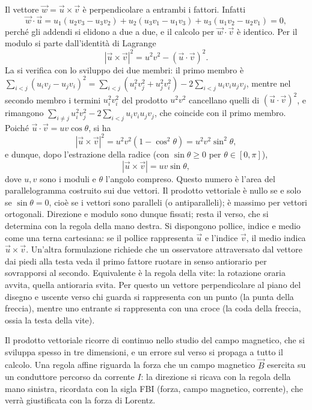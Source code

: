\documentclass[main.tex]{subfiles}
\begin{document}
Il vettore $\vec w=\vec u\times\vec v$ è perpendicolare a entrambi i fattori. Infatti
\[
\vec w\cdot\vec u=u_1(u_2v_3-u_3v_2)+u_2(u_3v_1-u_1v_3)+u_3(u_1v_2-u_2v_1)=0 ,
\]
perché gli addendi si elidono a due a due, e il calcolo per $\vec w\cdot\vec v$ è identico. Per il modulo si parte dall'identità di Lagrange
\[
|\vec u\times\vec v|^2=u^2v^2-(\vec u\cdot\vec v)^2 .
\]
La si verifica con lo sviluppo dei due membri: il primo membro è $\sum_{i<j}(u_iv_j-u_jv_i)^2=\sum_{i<j}(u_i^2v_j^2+u_j^2v_i^2)-2\sum_{i<j}u_iv_iu_jv_j$, mentre nel secondo membro i termini $u_i^2v_i^2$ del prodotto $u^2v^2$ cancellano quelli di $(\vec u\cdot\vec v)^2$, e rimangono $\sum_{i\neq j}u_i^2v_j^2-2\sum_{i<j}u_iv_iu_jv_j$, che coincide con il primo membro. Poiché $\vec u\cdot\vec v=uv\cos\theta$, si ha
\[
|\vec u\times\vec v|^2=u^2v^2(1-\cos^2\theta)=u^2v^2\sin^2\theta ,
\]
e dunque, dopo l'estrazione della radice (con $\sin\theta\ge0$ per $\theta\in[0,\pi]$),
\[
|\vec u\times\vec v|=uv\sin\theta ,
\]
dove $u,v$ sono i moduli e $\theta$ l'angolo compreso. Questo numero è l'area del parallelogramma costruito sui due vettori. Il prodotto vettoriale è nullo se e solo se $\sin\theta=0$, cioè se i vettori sono paralleli (o antiparalleli); è massimo per vettori ortogonali. Direzione e modulo sono dunque fissati; resta il verso, che si determina con la regola della mano destra. Si dispongono pollice, indice e medio come una terna cartesiana: se il pollice rappresenta $\vec u$ e l'indice $\vec v$, il medio indica $\vec u\times\vec v$. Un'altra formulazione richiede che un osservatore attraversato dal vettore dai piedi alla testa veda il primo fattore ruotare in senso antiorario per sovrapporsi al secondo. Equivalente è la regola della vite: la rotazione oraria avvita, quella antioraria svita. Per questo un vettore perpendicolare al piano del disegno e uscente verso chi guarda si rappresenta con un punto (la punta della freccia), mentre uno entrante si rappresenta con una croce (la coda della freccia, ossia la testa della vite).

Il prodotto vettoriale ricorre di continuo nello studio del campo magnetico, che si sviluppa spesso in tre dimensioni, e un errore sul verso si propaga a tutto il calcolo. Una regola affine riguarda la forza che un campo magnetico $\vec B$ esercita su un conduttore percorso da corrente $I$: la direzione si ricava con la regola della mano sinistra, ricordata con la sigla FBI (forza, campo magnetico, corrente), che verrà giustificata con la forza di Lorentz.
\end{document}

